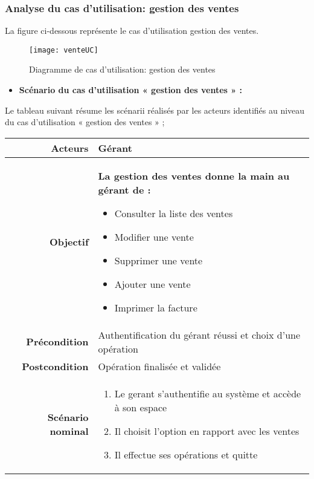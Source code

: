 \documentclass[a4paper,11pt]{article}
\begin{document}
\subsubsection{Analyse du cas d'utilisation: gestion des ventes}
La figure ci-dessous représente le cas d'utilisation gestion des ventes.
\newpage
\begin{figure}[ht]
\texttt{[image: venteUC]}
\caption{Diagramme de cas d'utilisation: gestion des ventes} 
\end{figure}
\begin{itemize}
  \item \textbf{Scénario du cas d’utilisation « gestion des ventes » :} 
\end{itemize}
Le tableau suivant résume les scénarii réalisés par les acteurs identifiés au niveau du cas
d’utilisation « gestion des ventes » ;
\newline
\newline
\begin{tabular}{|r|l|} \hline
\textbf{Acteurs} & Gérant\\ \hline
\textbf{Objectif} & \begin{minipage}{0.95\textwidth}
  \textbf{La gestion des ventes donne la main au gérant de :}
  \begin{itemize}
    \item Consulter la liste des ventes
    \item Modifier une vente
    \item Supprimer une vente
    \item Ajouter une vente
    \item Imprimer la facture
  \end{itemize}
\end{minipage} \\ \hline
\textbf{Précondition} & Authentification du gérant réussi et choix d'une opération \\ \hline
\textbf{Postcondition} & Opération finalisée et validée \\ \hline
\textbf{Scénario nominal} & \begin{minipage}{0.95\textwidth}
  \begin{enumerate}
    \item Le gerant s'authentifie au système et accède à son espace
    \item Il choisit l'option en rapport avec les ventes
    \item Il effectue ses opérations et quitte
\end{enumerate}
\end{minipage} \\ \hline
\end{tabular}
\end{document}

